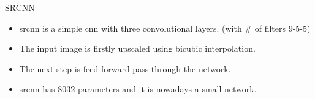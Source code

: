 \documentclass[hyperref={unicode}, xcolor=dvipsnames, t]{beamer}
\begin{document}
\begin{frame}{SRCNN}
    \begin{itemize}
        \item<1> \gls{srcnn} is a simple \gls{cnn} with \alert{three} convolutional layers. (with \# of filters 9-5-5)
        \item<1> The input image is firstly upscaled using bicubic interpolation.
        \item<1> The next step is feed-forward pass through the network.
        \item<1> \gls{srcnn} has 8032 parameters and it is nowadays a small network.
    \end{itemize}
    \begin{center}
\end{center}
\end{frame}
\end{document}
